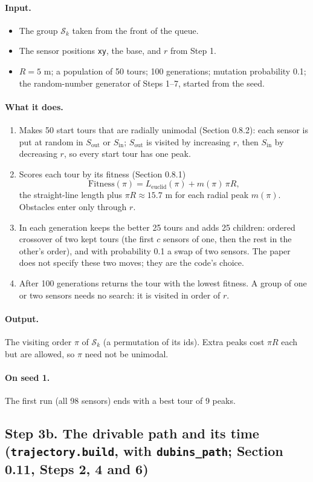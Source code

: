 \documentclass[10pt]{article}
\newcommand{\code}[1]{\texttt{#1}}
\newcommand{\inputs}{\paragraph{Input.}}
\newcommand{\does}{\paragraph{What it does.}}
\newcommand{\outputs}{\paragraph{Output.}}
\newcommand{\seedone}{\paragraph{On seed 1.}}
\begin{document}
\inputs
\begin{itemize}
  \item The group $\mathcal{S}_k$ taken from the front of the queue.
  \item The sensor positions \code{xy}, the base, and $r$ from Step 1.
  \item $R = 5$ m; a population of 50 tours; 100 generations; mutation probability 0.1; the random-number generator
    of Steps 1--7, started from the seed.
\end{itemize}
\does
\begin{enumerate}
  \item Makes 50 start tours that are radially unimodal (Section 0.8.2): each sensor is put at random in $S_{\mathrm{out}}$
    or $S_{\mathrm{in}}$; $S_{\mathrm{out}}$ is visited by increasing $r$, then $S_{\mathrm{in}}$ by decreasing $r$, so
    every start tour has one peak.
  \item Scores each tour by its fitness (Section 0.8.1)
    \[ \mathrm{Fitness}(\pi) = L_{\mathrm{euclid}}(\pi) + m(\pi)\,\pi R, \]
    the straight-line length plus $\pi R \approx 15.7$ m for each radial peak $m(\pi)$. Obstacles enter only through $r$.
  \item In each generation keeps the better 25 tours and adds 25 children: ordered crossover of two kept tours (the
    first $c$ sensors of one, then the rest in the other's order), and with probability 0.1 a swap of two sensors.
    The paper does not specify these two moves; they are the code's choice.
  \item After 100 generations returns the tour with the lowest fitness. A group of one or two sensors needs no search:
    it is visited in order of $r$.
\end{enumerate}
\outputs The visiting order $\pi$ of $\mathcal{S}_k$ (a permutation of its ids). Extra peaks cost $\pi R$ each but are
allowed, so $\pi$ need not be unimodal.
\seedone The first run (all 98 sensors) ends with a best tour of 9 peaks.

\subsection*{Step 3b. The drivable path and its time (\code{trajectory.build}, with \code{dubins\_path}; Section 0.11,
Steps 2, 4 and 6)}
\end{document}
